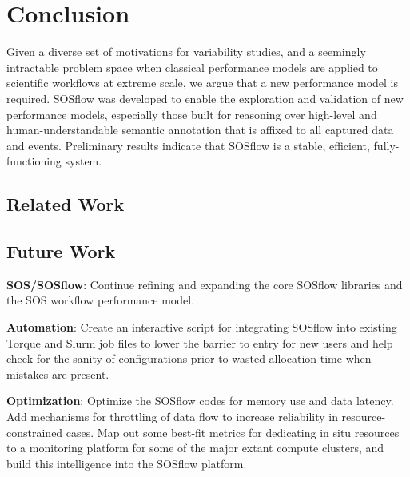 
\section{Conclusion}
Given a diverse set of motivations for variability studies, and a
seemingly intractable problem space when classical performance models
are applied to scientific workflows at extreme scale, we argue that a
new performance model is required. SOSflow was developed to enable the
exploration and validation of new performance models, especially those
built for reasoning over high-level and human-understandable semantic
annotation that is affixed to all captured data and events. Preliminary
results indicate that SOSflow is a stable, efficient, fully-functioning
system.



\subsection{Related Work}




\subsection{Future Work}

\textbf{SOS/SOSflow}: Continue refining and expanding the core SOSflow
libraries and the SOS workflow performance model.

\textbf{Automation}: Create an interactive script for integrating
SOSflow into existing Torque and Slurm job files to lower the barrier
to entry for new users and help check for the sanity of configurations
prior to wasted allocation time when mistakes are present.

\textbf{Optimization}: Optimize the SOSflow codes for memory use and
data latency. Add mechanisms for throttling of data flow to increase
reliability in resource-constrained cases. Map out some best-fit
metrics for dedicating in situ resources to a monitoring platform for
some of the major extant compute clusters, and build this intelligence
into the SOSflow platform.

